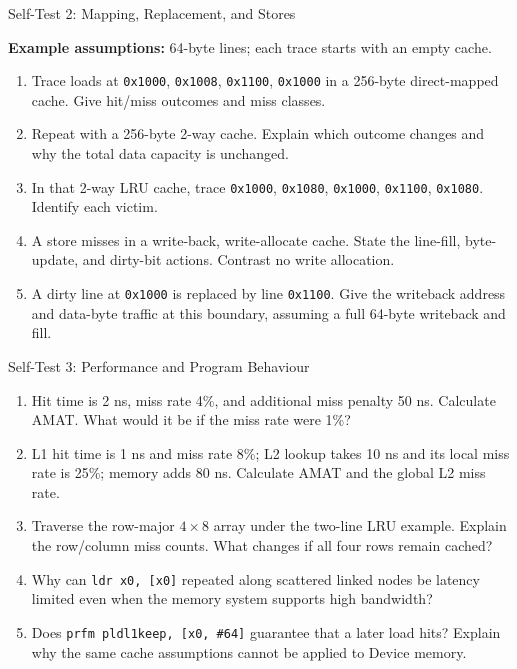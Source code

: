 \documentclass[aspectratio=169,11pt,t]{beamer}
\newcommand{\hex}[1]{\texttt{0x#1}}
\newcommand{\code}[1]{\texttt{#1}}
\newcommand{\Model}[1]{\par{\scriptsize\color{deepblue}\textbf{Example assumptions:} #1\par}\vspace{.14cm}}
\begin{document}
\begin{frame}{Self-Test 2: Mapping, Replacement, and Stores}
\small
\Model{64-byte lines; each trace starts with an empty cache.}
\begin{enumerate}\setlength{\itemsep}{8pt}
  \item Trace loads at \hex{1000}, \hex{1008}, \hex{1100}, \hex{1000} in a 256-byte direct-mapped cache. Give hit/miss outcomes and miss classes.
  \item Repeat with a 256-byte 2-way cache. Explain which outcome changes and why the total data capacity is unchanged.
  \item In that 2-way LRU cache, trace \hex{1000}, \hex{1080}, \hex{1000}, \hex{1100}, \hex{1080}. Identify each victim.
  \item A store misses in a write-back, write-allocate cache. State the line-fill, byte-update, and dirty-bit actions. Contrast no write allocation.
  \item A dirty line at \hex{1000} is replaced by line \hex{1100}. Give the writeback address and data-byte traffic at this boundary, assuming a full 64-byte writeback and fill.
\end{enumerate}
\end{frame}

\begin{frame}{Self-Test 3: Performance and Program Behaviour}
\small
\begin{enumerate}\setlength{\itemsep}{9pt}
  \item Hit time is 2 ns, miss rate 4\%, and additional miss penalty 50 ns. Calculate AMAT. What would it be if the miss rate were 1\%?
  \item L1 hit time is 1 ns and miss rate 8\%; L2 lookup takes 10 ns and its local miss rate is 25\%; memory adds 80 ns. Calculate AMAT and the global L2 miss rate.
  \item Traverse the row-major \(4\times8\) array under the two-line LRU example. Explain the row/column miss counts. What changes if all four rows remain cached?
  \item Why can \code{ldr x0, [x0]} repeated along scattered linked nodes be latency limited even when the memory system supports high bandwidth?
  \item Does \code{prfm pldl1keep, [x0, \#64]} guarantee that a later load hits? Explain why the same cache assumptions cannot be applied to Device memory.
\end{enumerate}
\end{frame}
\end{document}
